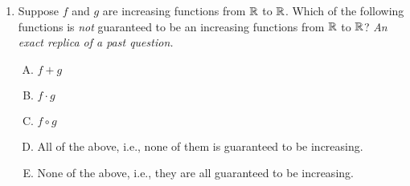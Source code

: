 \documentclass[10pt]{amsart}
\begin{document}
\begin{enumerate}
  {\em Answer}: Option (C)

  {\em Explanation}: The points where $f$ is undefined are $x = \pm
  1$. At both these points, the limit is undefined, but the function
  is bounded, because the $x$-part has a finite limit and the
  $\sin(1/(x^2 - 1))$ part is bounded in $[-1,1]$. Thus, the function
  cannot have a vertical asymptote (in fact, it is oscillatory with no
  limit at both these points).

  For the horizontal asymptote, we rewrite the limit at $+\infty$ as:

  $$\lim_{x \to \infty} \frac{x}{x^2 - 1} \lim_{x \to \infty} (x^2 - 1)\sin(1/(x^2 - 1))$$

  The first limit is $0$. As for the second limit, putting $t = 1/(x^2
  - 1)$, we see that $t \to 0^+$ as $x \to \infty$, so the second
  limit becomes $\lim_{t \to 0^+} (\sin t)/t = 1$. The overall limit
  at $+\infty$ is thus $0$. A similar argument works for
  $-\infty$. Note that since $x^2 - 1$ has even degree, we get
  $\lim_{t \to 0^+} (\sin t)/t$ in this case as well.

  {\em Performance review}: $4$ out of $12$ got this correct. $4$
  chose (A), $2$ chose (E), $1$ each chose (B) and (D).
  
  {\em Historical note (last year)}: $3$ out of $16$ people
  got this correct. $6$ people chose (A), $5$ people chose (B), and
  $1$ person each chose (D) and (E).

  {\em Action point}: Since the most commonly chosen incorrect answer
  was (A), it seems that most people figured out the horizontal
  asymptotes correctly. However, the vertical asymptotes confused
  people -- not surprisingly, because they confused me too when I dug
  up this question from last year. Once you read the solution,
  however, you should be able to understand it.
\item Suppose $f$ and $g$ are increasing functions from $\mathbb{R}$ to
  $\mathbb{R}$. Which of the following functions is {\em not} guaranteed to be
  an increasing functions from $\mathbb{R}$ to $\mathbb{R}$? {\em An exact replica of
  a past question.}

  \begin{enumerate}[(A)]

  \item $f + g$
  \item $f \cdot g$
  \item $f \circ g$
  \item All of the above, i.e., none of them is guaranteed to be increasing.
  \item None of the above, i.e., they are all guaranteed to be increasing.
  \end{enumerate}


\end{enumerate}
\end{document}
